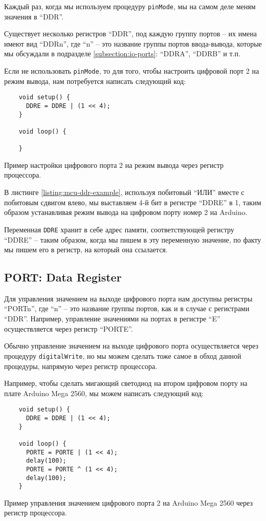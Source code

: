 \documentclass[../sparc.tex]{subfiles}
\begin{document}
Каждый раз, когда мы используем процедуру \texttt{pinMode}, мы на самом
деле меням значения в ``DDR''.

Существует несколько регистров ``DDR'', под каждую группу портов -- их имена
имеют вид ``DDRn'', где ``n'' -- это название группы портов ввода-вывода, которые
мы обсуждали в подразделе \ref{subsection:io-ports}: ``DDRA'', ``DDRB'' и т.п.

Если не использовать \texttt{pinMode}, то для того, чтобы настроить
цифровой порт 2 на режим вывода, нам потребуется написать следующий код:

\begin{listing}[H]
  \begin{verbatim}
    void setup() {
      DDRE = DDRE | (1 << 4);
    }

    void loop() {

    }
  \end{verbatim}
  \caption{Пример настройки цифрового порта 2 на режим вывода через регистр
    процессора.}
  \label{listing:mcu-ddr-example}
\end{listing}

В листинге \ref{listing:mcu-ddr-example}, используя побитовый ``ИЛИ'' вместе с
побитовым сдвигом влево, мы выставляем 4-й бит в регистре ``DDRE'' в 1, таким
образом устанавливая режим вывода на цифровом порту номер 2 на Arduino.

Переменная \texttt{DDRE} хранит в себе адрес памяти, соответствующей
регистру ``DDRE'' -- таким образом, когда мы пишем в эту переменную значение, по
факту мы пишем его в регистр, на который она ссылается.

\subsection{PORT: Data Register}

Для управления значением на выходе цифрового порта нам доступны регистры
``PORTn'', где ``n'' -- это название группы портов, как и в случае с регистрами
``DDR''.  Например, управление значениями на портах в регистре ``E''
осуществляется через регистр ``PORTE''.

Обычно управление значением на выходе цифрового порта осуществляется через
процедуру \texttt{digitalWrite}, но мы можем сделать тоже самое в обход
данной процедуры, напрямую через регистр процессора.

Например, чтобы сделать мигающий светодиод на втором цифровом порту на плате
Arduino Mega 2560, мы можем написать следующий код:

\begin{listing}[H]
  \begin{verbatim}
    void setup() {
      DDRE = DDRE | (1 << 4);
    }

    void loop() {
      PORTE = PORTE | (1 << 4);
      delay(100);
      PORTE = PORTE ^ (1 << 4);
      delay(100);
    }
  \end{verbatim}
  \caption{Пример управления значением цифрового порта 2 на Arduino Mega 2560
    через регистр процессора.}
  \label{listing:mcu-port-example}
\end{listing}
\end{document}
